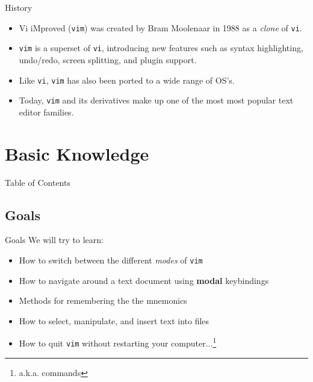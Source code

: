 \documentclass{beamer}
\begin{document}
\begin{frame}{History}
	\begin{itemize}
		\item Vi iMproved (\texttt{vim}) was created by Bram Moolenaar
			in 1988 as a \textit{clone} of \texttt{vi}.
			\pause

		\item \texttt{vim} is a superset of \texttt{vi}, introducing new
			features such as syntax highlighting, undo/redo, screen
			splitting, and plugin support.
			\pause

		\item Like \texttt{vi}, \texttt{vim} has also been ported to a
			wide range of OS's.
			\pause

		\item Today, \texttt{vim} and its derivatives make up one of the
			most most popular text editor families.\footnotemark
	\end{itemize}

\end{frame}


\section{Basic Knowledge}
\begin{frame}{Table of Contents}
	\tableofcontents[currentsection]
\end{frame}

\subsection{Goals}
\begin{frame}{Goals}
	We will try to learn:\\
	\begin{itemize}
		\item How to switch between the different \textit{modes}
			of \texttt{vim}
			\pause

		\item How to navigate around a text document using
			\textbf{modal} keybindings
			\pause

		\item Methods for remembering the the mnemonics
			\pause

		\item How to select, manipulate, and insert text into files
			\pause

		\item How to quit \texttt{vim} without restarting your
			computer...\footnote{a.k.a. commands}

	\end{itemize}
\end{frame}
\end{document}
